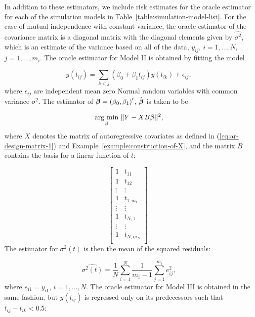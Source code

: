 \bigskip

In addition to these estimators, we include risk estimates for the oracle estimator for each of the simulation models in Table~\ref{table:simulation-model-list}. For the case of mutual independence with constant variance, the oracle estimator of the covariance matrix is a diagonal matrix with the diagonal elements given by $\hat{\sigma^2}$, which is an estimate of the variance based on all of the data, $y_{ij}$, $i = 1,\dots, N$, $j = 1,\dots, m_i$. The oracle estimator for Model II is obtained by fitting the model

\begin{equation} \label{eq:model-2-oracle-model}
y\left(t_{ij}\right) = \sum_{k < j} \left(\beta_0 + \beta_1 t_{ij}\right) y\left( t_{ik} \right) + \epsilon_{ij},
\end{equation}
\noindent 
where $\epsilon_{ij}$ are independent mean zero Normal random variables with common variance $\sigma^2$. The estimator of $\mbox{\boldmath $\beta$} = \left(\beta_0, \beta_1\right)'$, $\hat{\mbox{\boldmath $\beta$}}$ is taken to be 

\begin{equation}\label{eq:model-2-oracle-estimator}
\underset{\beta}{\operatorname{arg}\,\operatorname{min}}\; \vert \vert Y - X B \beta \vert \vert^2, 
\end{equation}
\noindent
where $X$ denotes the matrix of autoregressive covariates as defined in (\ref{eq:ar-design-matrix-1}) and Example~\ref{example:construction-of-X}, and the matrix $B$ contains the basis for a linear function of $t$:

\[
\begin{bmatrix}
1 & t_{11} \\
1 & t_{12} \\
\vdots & \vdots \\
1 & t_{1,m_1} \\
\vdots & \vdots \\
1 & t_{N,1} \\
\vdots & \vdots \\
1 & t_{N,m_N} \\
\end{bmatrix}.
\]
\noindent
The estimator for $\sigma^2\left(t\right)$ is then the mean of the squared residuals:

\[
\hat{\sigma^2\left( t \right)} = \frac{1}{N}\sum_{i = 1}^N\frac{1}{m_i - 1} \sum_{j = 1}^{m_i} e_{ij}^2,
\]
\noindent
where $e_{i1} = y_{i1}$, $i = 1,\dots, N$. The oracle estimator for Model III is obtained in the same fashion, but $y\left(t_{ij}\right)$ is regressed only on its predecessors such that $t_{ij} - t_{ik} < 0.5$:

